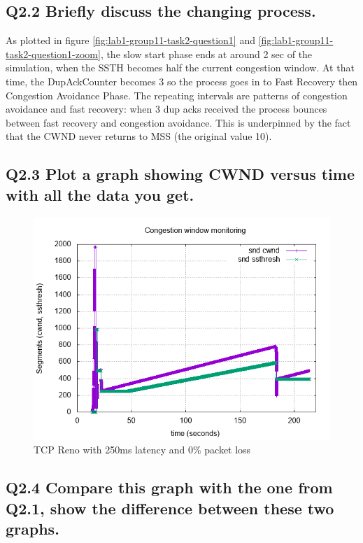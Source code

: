 \documentclass{article}
\begin{document}
\subsection{Q2.2 Briefly discuss the changing process.}

As plotted in figure \ref{fig:lab1-group11-task2-question1} and \ref{fig:lab1-group11-task2-question1-zoom}, the slow start phase ends at around 2 sec of the simulation, when the SSTH becomes half the current congestion window. At that time, the DupAckCounter becomes 3 so the process goes in to Fast Recovery then Congestion Avoidance Phase. The repeating intervals are patterns of congestion avoidance and fast recovery: when 3 dup acks received the process bounces between fast recovery and congestion avoidance. This is underpinned by the fact that the CWND never returns to MSS (the original value 10).

\newpage

\subsection{Q2.3 Plot a graph showing CWND versus time with all the data
you get.}

\begin{figure}[h]
    \centering
    \includegraphics[scale=0.6]{images/lab1-group11-task2-question3.png}
    \caption{TCP Reno with 250ms latency and 0\% packet loss}
    \label{fig:lab1-group11-task2-question3}
\end{figure}

\subsection{Q2.4 Compare  this  graph  with  the  one  from  Q2.1,  show  the  difference  between  these  two
graphs.}
\end{document}
